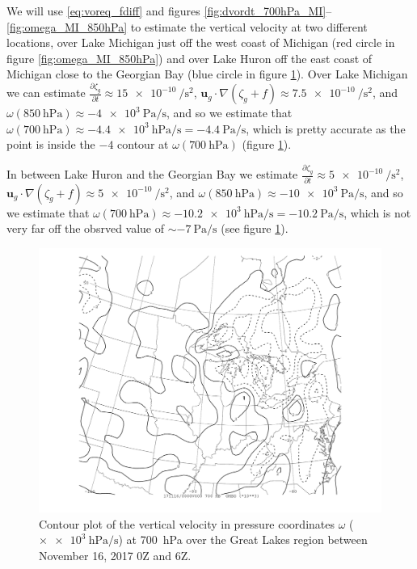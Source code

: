 \documentclass[11pt]{article}
\newcommand\p[2]{\frac{\partial #1}{\partial #2}}
\begin{document}
We will use \eqref{eq:voreq_fdiff} and figures \ref{fig:dvordt_700hPa_MI}--\ref{fig:omega_MI_850hPa} to estimate the vertical velocity at two different locations, over Lake Michigan just off the west coast of Michigan (red circle in figure \ref{fig:omega_MI_850hPa}) and over Lake Huron off the east coast of Michigan close to the Georgian Bay (blue circle in figure \ref{fig:omega_MI_700hPa}). Over Lake Michigan we can estimate $\p{\zeta_g}{t} \approx \SI{15e-10}{\per\s\squared}$, $\bm{u}_g \cdot \nabla (\zeta_g + f) \approx \SI{7.5e-10}{\per\s\squared}$, and $\omega(\SI{850}{\hecto\Pa}) \approx \SI{-4e3}{\Pa\per\s}$, and so we estimate that $\omega(\SI{700}{\hecto\Pa}) \approx \SI{-4.4e3}{\hecto\Pa\per\s} = \SI{-4.4}{\Pa\per\s}$, which is pretty accurate as the point is inside the $-4$ contour at $\omega(\SI{700}{\hecto\Pa})$ (figure \ref{fig:omega_MI_700hPa}).

In between Lake Huron and the Georgian Bay we estimate $\p{\zeta_g}{t} \approx \SI{5e-10}{\per\s\squared}$, $\bm{u}_g \cdot \nabla (\zeta_g + f) \approx \SI{5e-10}{\per\s\squared}$, and $\omega(\SI{850}{\hecto\Pa}) \approx \SI{-10e3}{\Pa\per\s}$, and so we estimate that $\omega(\SI{700}{\hecto\Pa}) \approx \SI{-10.2e3}{\hecto\Pa\per\s} = \SI{-10.2}{\Pa\per\s}$, which is not very far off the obsrved value of $\sim \SI{-7}{\Pa\per\s}$ (see figure \ref{fig:omega_MI_700hPa}).

\begin{figure}[h!]
  \centering
  \includegraphics[width=\textwidth,trim={2.5cm 1cm 2.5cm 0},clip]{omega_MI_700hPa}
  \caption{Contour plot of the vertical velocity in pressure coordinates $\omega$ ($\times \SI{e3}{\hecto\Pa\per\s}$) at \SI{700}{\hecto\Pa} over the Great Lakes region between November 16, 2017 0Z and 6Z.}
  \label{fig:omega_MI_700hPa}
\end{figure}
\end{document}
